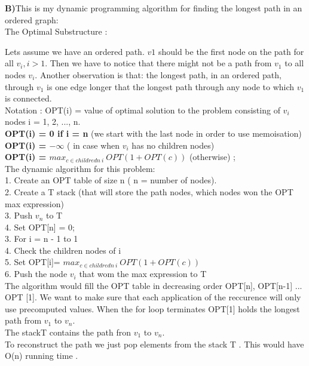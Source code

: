 \documentclass[11 pt]{article}
\begin{document}
\textbf{B)}This is my dynamic programming algorithm for finding the longest path
in an ordered graph:\\

The Optimal Substructure :

Lets assume we have an ordered path. $v1$ should be the first node on the path for all $ v_i, i  > 1$. 
Then we have to notice that  there might not be a path from $v_1$ to all nodes $v_i$. Another observation is that: the longest path, in an ordered path, through $v_1$ is one edge longer that the longest path through any node to which $v_1$ is connected.  \\
Notation :   OPT(i) = value of optimal solution to the problem consisting of $v_i$ nodes  i = 1, 2, ..., n.\\

\textbf{   OPT(i) = 0  if i = n }               (we start with the last node in order to use memoisation) \\
 \textbf{  OPT(i) = $- \infty$ }                             ( in case when $v_i $ has no children nodes)\\
\textbf{ OPT(i) = $max_{c \in childredn \ i } \ OPT (1 + OPT(c))$ } (otherwise) ;\\


 The dynamic algorithm for this problem:\\
1. Create an OPT table of size n ( n = number of nodes).\\
2. Create a T stack  (that will store the path nodes, which nodes won the OPT max expression)\\
3. Push $v_n $ to T\\ 
4. Set OPT[n] = 0; \\
3. For i = n - 1 to 1 \\
4. Check the children nodes of i \\
5.  Set OPT[i]= $max_{c \in childredn \ i } \ OPT (1 + OPT(c))$ \\
6. Push the node $v_i$ that wom the max expression to T\\

 The algorithm would fill the OPT table in decreasing order OPT[n], OPT[n-1] ... OPT [1]. We want to make sure that each application of the reccurence will only use precomputed values.
When the for loop terminates OPT[1]  holds the longest path from $v_1$ to $v_n$. \\
The stackT contains the path fron $v_1$ to $v_n$.\\
To reconstruct the path we just pop elements from the stack T . This would have O(n) running time . \\
\end{document}
